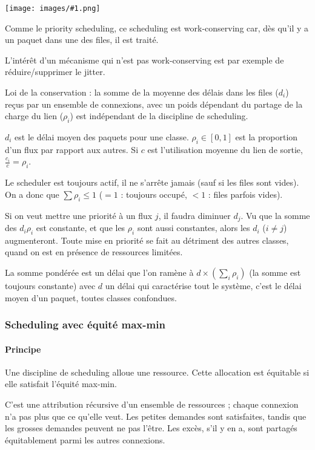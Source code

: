\documentclass[10pt,a4paper]{report}
\newcommand{\dessin}[1]{\begin{center}\texttt{[image: images/\#1.png]}\end{center}}
\begin{document}
			\dessin{93}
		
			Comme le priority scheduling, ce scheduling est work-conserving car, dès qu'il y a un paquet dans une des files, il est traité. 
			
			L'intérêt d'un mécanisme qui n'est pas work-conserving est par exemple de réduire/supprimer le jitter.
			
			Loi de la conservation : la somme de la moyenne des délais dans les files ($d_i$) reçus par un ensemble de connexions, avec un poids dépendant du partage de la charge du lien ($\rho_i$) est indépendant de la discipline de scheduling.
			
			$d_i$ est le délai moyen des paquets pour une classe. $\rho_i \in [0, 1]$ est la proportion d'un flux par rapport aux autres. Si $c$ est l'utilisation moyenne du lien de sortie, $\frac{c_i}{c} = \rho_i$.
			
		
			Le scheduler est toujours actif, il ne s'arrête jamais (sauf si les files sont vides). On a donc que $\sum \rho_i \leq 1$ ($= 1$ : toujours occupé, $< 1$ : files parfois vides).
		
			Si on veut mettre une priorité à un flux $j$, il faudra diminuer $d_j$. Vu que la somme des $d_i \rho_i$ est constante, et que les $\rho_i$ sont aussi constantes, alors les $d_i$ ($i \neq j$) augmenteront. Toute mise en priorité se fait au détriment des autres classes, quand on est en présence de ressources limitées.
		
			La somme pondérée est un délai que l'on ramène à $d \times (\sum_i \rho_i)$ (la somme est toujours constante) avec $d$ un délai qui caractérise tout le système, c'est le délai moyen d'un paquet, toutes classes confondues.
		
		
			\subsubsection{Scheduling avec équité max-min}
			
			\paragraph{Principe}
			Une discipline de scheduling alloue une ressource. Cette allocation est équitable si elle satisfait l'équité max-min.
			
			C'est une attribution récursive d'un ensemble de ressources ; chaque connexion n'a pas plus que ce qu'elle veut. Les petites demandes sont satisfaites, tandis que les grosses demandes peuvent ne pas l'être. Les excès, s'il y en a, sont partagés équitablement parmi les autres connexions.
			
\end{document}
